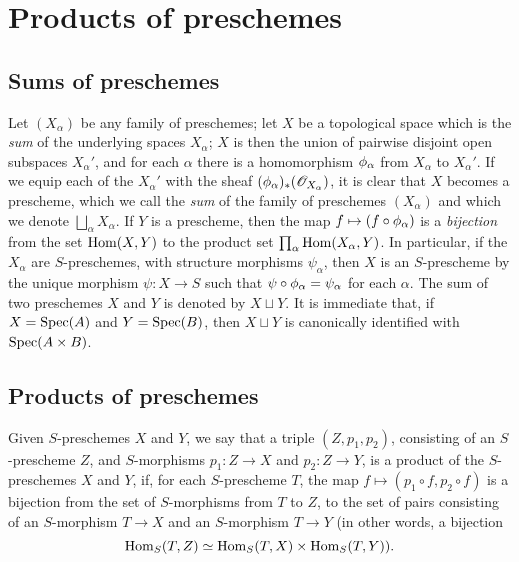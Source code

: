 \section{Products of preschemes}
\label{section:1.3}

\subsection{Sums of preschemes}
\label{subsection:1.3.1}

Let $(X_\alpha)$ be any family of preschemes; let $X$ be a topological space which is the
\emph{sum} of the underlying spaces $X_\alpha$; $X$ is then the union of pairwise
disjoint open subspaces $X_\alpha'$, and for each $\alpha$ there is a homomorphism
$\phi_\alpha$ from $X_\alpha$ to $X_\alpha'$. If we equip each of the $X_\alpha'$ with the
sheaf $(\phi_\alpha)_*(\mathscr{O}_{X_\alpha})$, it is clear that $X$ becomes a prescheme, which
we call the \emph{sum} of the family of preschemes $(X_\alpha)$ and which we denote
$\bigsqcup_\alpha X_\alpha$. If $Y$ is a prescheme, then the map $f\mapsto(f\circ\vphi_\alpha)$ is a
\emph{bijection} from the set $\operatorname{Hom}(X,Y)$ to the product set $\prod_\alpha\operatorname{Hom}(X_\alpha,Y)$.
In particular, if the $X_\alpha$ are $S$-preschemes, with structure morphisms $\psi_\alpha$, then $X$ is an $S$-prescheme by the unique morphism $\psi:X\to S$ such that
$\psi\circ\phi_\alpha=\psi_\alpha$ for each $\alpha$. The sum of two preschemes $X$ and $Y$ is denoted by $X\sqcup Y$.
It is immediate that, if $X=\operatorname{Spec}(A)$ and $Y=\operatorname{Spec}(B)$, then $X\sqcup Y$ is canonically identified with $\operatorname{Spec}(A\times B)$.

\subsection{Products of preschemes}
\label{subsection:1.3.2}

\begin{definition}[3.2.1]
\label{1.3.2.1}
Given $S$-preschemes $X$ and $Y$, we say that a triple $(Z,p_1,p_2)$, consisting of an
$S$-prescheme $Z$, and $S$-morphisms $p_1:Z\to X$ and $p_2:Z\to Y$, is a product of the
$S$-preschemes $X$ and $Y$, if, for each $S$-prescheme $T$, the map
$f\mapsto(p_1\circ f,p_2\circ f)$ is a bijection from the set of $S$-morphisms from $T$ to
$Z$, to the set of pairs consisting of an $S$-morphism $T\to X$ and an $S$-morphism $T\to Y$
(in other words, a bijection
\[
  \operatorname{Hom}_S(T,Z)\simeq\operatorname{Hom}_S(T,X)\times\operatorname{Hom}_S(T,Y)).
\]
\end{definition}

